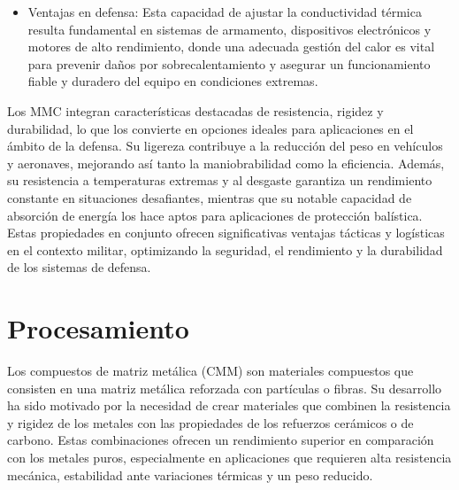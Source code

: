 \documentclass[letterpaper, 12pt]{article}
\begin{document}
\begin{enumerate}
\begin{itemize}
                  \item Ventajas en defensa: Esta capacidad de ajustar la conductividad térmica resulta
                        fundamental en sistemas de armamento, dispositivos electrónicos y motores de
                        alto rendimiento, donde una adecuada gestión del calor es vital para prevenir
                        daños por sobrecalentamiento y asegurar un funcionamiento fiable y duradero del
                        equipo en condiciones extremas.
            \end{itemize}
\end{enumerate}

Los MMC integran características destacadas de resistencia, rigidez y
durabilidad, lo que los convierte en opciones ideales para aplicaciones en el
ámbito de la defensa. Su ligereza contribuye a la reducción del peso en
vehículos y aeronaves, mejorando así tanto la maniobrabilidad como la
eficiencia. Además, su resistencia a temperaturas extremas y al desgaste
garantiza un rendimiento constante en situaciones desafiantes, mientras que su
notable capacidad de absorción de energía los hace aptos para aplicaciones de
protección balística. Estas propiedades en conjunto ofrecen significativas
ventajas tácticas y logísticas en el contexto militar, optimizando la
seguridad, el rendimiento y la durabilidad de los sistemas de defensa.

\section{Procesamiento}

Los compuestos de matriz metálica (CMM) son materiales compuestos que consisten
en una matriz metálica reforzada con partículas o fibras. Su desarrollo ha sido
motivado por la necesidad de crear materiales que combinen la resistencia y
rigidez de los metales con las propiedades de los refuerzos cerámicos o de
carbono. Estas combinaciones ofrecen un rendimiento superior en comparación con
los metales puros, especialmente en aplicaciones que requieren alta resistencia
mecánica, estabilidad ante variaciones térmicas y un peso reducido.
\end{document}
